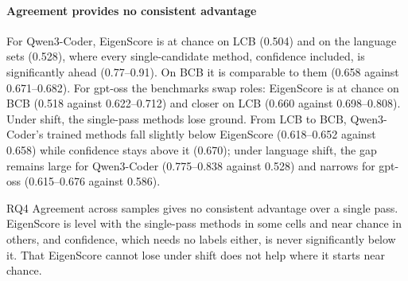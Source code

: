 \paragraph{Agreement provides no consistent advantage}
For Qwen3-Coder, EigenScore is at chance on LCB (0.504) and on the language
sets (0.528), where every single-candidate method, confidence included, is
significantly ahead (0.77--0.91). On BCB it is comparable to them (0.658 against
0.671--0.682). For gpt-oss the benchmarks swap roles: EigenScore is at chance
on BCB (0.518 against 0.622--0.712) and closer on LCB (0.660 against
0.698--0.808). Under shift, the single-pass methods lose ground. 
From LCB to BCB, Qwen3-Coder's trained methods fall slightly below EigenScore (0.618--0.652 against 0.658) while confidence stays above it (0.670); under language shift, the
gap remains large for Qwen3-Coder (0.775--0.838 against 0.528) and narrows for
gpt-oss (0.615--0.676 against 0.586).


\begin{rqanswer}{RQ4}
Agreement across samples gives no consistent advantage over a single pass.
EigenScore is level with the single-pass methods in some cells and near
chance in others, and confidence, which needs no labels either, is never
significantly below it. That EigenScore cannot lose under shift does not help where it starts near chance.
\end{rqanswer}

